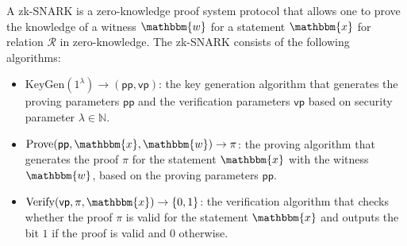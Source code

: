 \documentclass{iacrtrans}
\begin{document}
\begin{definition}
    A zk-SNARK is a zero-knowledge proof system protocol that allows one to
    prove the knowledge of a witness $\mathbbm{w}$ for a statement $\mathbbm{x}$
    for relation $\mathcal{R}$ in zero-knowledge. The zk-SNARK consists of the
    following algorithms:
    \begin{itemize}
        \item $\mathrm{KeyGen}(1^{\lambda}) \to (\mathsf{pp},\mathsf{vp})$: the
        key generation algorithm that generates the proving parameters
        $\mathsf{pp}$ and the verification parameters $\mathsf{vp}$ based on
        security parameter $\lambda \in \mathbb{N}$.
        \item $\mathrm{Prove}(\mathsf{pp}, \mathbbm{x}, \mathbbm{w}) \to \pi$: the
        proving algorithm that generates the proof $\pi$ for the statement
        $\mathbbm{x}$ with the witness $\mathbbm{w}$, based on the proving 
        parameters $\mathsf{pp}$.
        \item $\mathrm{Verify}(\mathsf{vp}, \pi, \mathbbm{x}) \to \{0, 1\}$: the
        verification algorithm that checks whether the proof $\pi$ is valid for
        the statement $\mathbbm{x}$ and outputs the bit $1$ if the proof is
        valid and $0$ otherwise.
    \end{itemize}


\end{definition}
\end{document}
